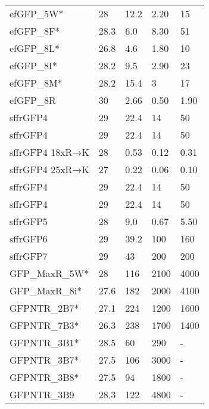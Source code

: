 \documentclass[10pt, a4paper, twocolumn]{article}
\begin{document}
\begin{table*}[h]
\begin{minipage}{0.48\linewidth}
{\begin{tabular}{p{3cm}|p{1cm}|p{2cm}|p{1.2cm}|p{1.2cm}}
efGFP\_5W* & 28 & 12.2 & 2.20 & 15 \\
efGFP\_8F* & 28.3 & 6.0 & 8.30 & 51 \\
efGFP\_8L* & 26.8 & 4.6 & 1.80 & 10 \\
efGFP\_8I* & 28.2 & 9.5 & 2.90 & 23 \\
efGFP\_8M* & 28.2 & 15.4 & 3 & 17 \\
efGFP\_8R & 30 & 2.66 & 0.50 & 1.90 \\
sffrGFP4 & 29 & 22.4 & 14 & 50 \\
sffrGFP4 & 29 & 22.4 & 14 & 50 \\
sffrGFP4 18xR→K & 28 & 0.53 & 0.12 & 0.31 \\
sffrGFP4 25xR→K & 27 & 0.22 & 0.06 & 0.10 \\
sffrGFP4 & 29 & 22.4 & 14 & 50 \\
sffrGFP4 & 29 & 22.4 & 14 & 50 \\
sffrGFP5 & 28 & 9.0 & 0.67 & 5.50 \\
sffrGFP6 & 29 & 39.2 & 100 & 160 \\
sffrGFP7 & 29 & 43 & 200 & 200 \\
GFP\_MaxR\_5W* & 28 & 116 & 2100 & 4000 \\
GFP\_MaxR\_8i* & 27.6 & 182 & 2000 & 4100 \\
GFPNTR\_2B7* & 27.1 & 224 & 1200 & 1600 \\
GFPNTR\_7B3* & 26.3 & 238 & 1700 & 1400 \\
GFPNTR\_3B1* & 28.5 & 60 & 290 & - \\
GFPNTR\_3B7* & 27.5 & 106 & 3000 & - \\
GFPNTR\_3B8* & 27.5 & 94 & 1800 & - \\
GFPNTR\_3B9 & 28.3 & 122 & 4800 & - \\
\end{tabular}
}
\label{tbl:attr_probes}
\end{minipage}
\end{table*}
\end{document}

